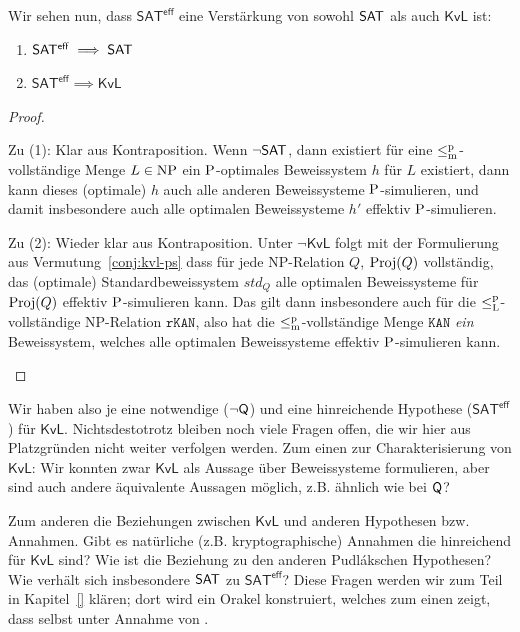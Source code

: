 Wir sehen nun, dass $\mathsf{SAT^{eff}}$ eine Verstärkung von sowohl $\hSAT$ als auch $\mathsf{KvL}$ ist:
\begin{theorem}\label{thm:sateff-generalizes-sat}
    \begin{enumerate}
        \item $\mathsf{SAT^{eff}}\implies \hSAT$
        \item $\mathsf{SAT^{eff}}\implies \mathsf{KvL}$
    \end{enumerate}
\end{theorem}
\begin{proof}
\begin{prooflist}[label={}]
\item Zu (1): Klar aus Kontraposition. Wenn $\neg\hSAT$, dann existiert für eine $\leqmp$-vollständige Menge $L\in\NP$ ein $\P$-optimales Beweissystem $h$ für $L$ existiert, dann kann dieses (optimale) $h$ auch alle anderen Beweissysteme $\P$-simulieren, und damit insbesondere auch alle optimalen Beweissysteme $h'$ effektiv $\P$-simulieren.

\item Zu (2): Wieder klar aus Kontraposition. Unter $\neg\mathsf{KvL}$ folgt mit der Formulierung aus Vermutung~\ref{conj:kvl-ps} dass für jede NP-Relation $Q$, $\Proj(Q)$ vollständig, das (optimale) Standardbeweissystem $\mathit{std}_Q$ alle optimalen Beweissysteme für $\Proj(Q)$ effektiv $\P$-simulieren kann. Das gilt dann insbesondere auch für die $\leqlp$-vollständige NP-Relation $\mathtt{rKAN}$, also hat die $\leqmp$-vollständige Menge $\mathtt{KAN}$ \emph{ein} Beweissystem, welches alle optimalen Beweissysteme effektiv $\P$-simulieren kann.
\end{prooflist}
\end{proof}

Wir haben also je eine notwendige ($\neg\hQ$) und eine hinreichende Hypothese ($\mathsf{SAT^{eff}}$) für $\mathsf{KvL}$. 
Nichtsdestotrotz bleiben noch viele Fragen offen, die wir hier aus Platzgründen nicht weiter verfolgen werden. 
Zum einen zur Charakterisierung von $\mathsf{KvL}$:
Wir konnten zwar $\mathsf{KvL}$ als Aussage über Beweissysteme formulieren, aber sind auch andere äquivalente Aussagen möglich, z.B. ähnlich wie bei $\hQ$?

Zum anderen die Beziehungen zwischen $\mathsf{KvL}$ und anderen Hypothesen bzw. Annahmen.
Gibt es natürliche (z.B. kryptographische) Annahmen die hinreichend für $\mathsf{KvL}$ sind? Wie ist die Beziehung zu den anderen Pudlákschen Hypothesen? Wie verhält sich insbesondere $\hSAT$ zu $\mathsf{SAT^{eff}}$? 
Diese Fragen werden wir zum Teil in Kapitel~\ref{} klären; dort wird ein Orakel konstruiert, welches zum einen zeigt, dass selbst unter Annahme von \todo{}.

